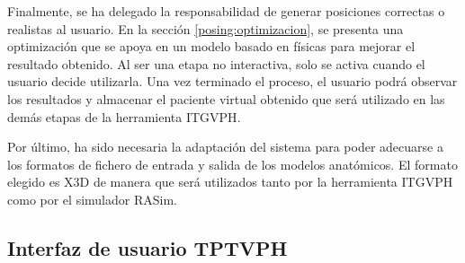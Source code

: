Finalmente, se ha delegado la responsabilidad de generar posiciones correctas o realistas al usuario. En la sección \ref{posing:optimizacion}, se presenta una optimización que se apoya en un modelo basado en físicas para mejorar el resultado obtenido. Al ser una etapa no interactiva, solo se activa cuando el usuario decide utilizarla. Una vez terminado el proceso, el usuario podrá observar los resultados y almacenar el paciente virtual obtenido que será utilizado en las demás etapas de la herramienta \ac{ITGVPH}.  

Por último,  ha sido necesaria la adaptación del sistema para poder adecuarse a los formatos de fichero de entrada y salida de los modelos anatómicos. El formato elegido es \ac{X3D} de manera que será utilizados tanto por la herramienta \ac{ITGVPH} como por el simulador \ac{RASim}.

\subsection{Interfaz de usuario \ac{TPTVPH}}


